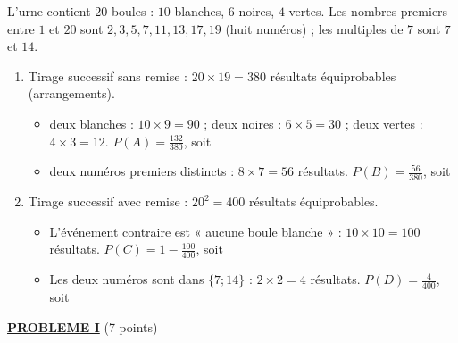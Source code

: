 \begin{description}
\begin{enumerate}
	\end{enumerate}
	\item[II. ]
	L'urne contient $20$ boules : $10$ blanches, $6$ noires, $4$ vertes.
	Les nombres premiers entre $1$ et $20$ sont $2, 3, 5, 7, 11, 13, 17, 19$ (huit numéros) ;
	les multiples de $7$ sont $7$ et $14$.
	\begin{enumerate}
		\item Tirage successif sans remise : $20 \times 19 = 380$ résultats équiprobables (arrangements).
		\begin{itemize}
			\item {}
				deux blanches : $10 \times 9 = 90$ ; deux noires : $6 \times 5 = 30$ ; deux vertes : $4 \times 3 = 12$.
				$P(A) = \frac{132}{380}$, soit \par\noindent{}
			\item {}
				deux numéros premiers distincts : $8 \times 7 = 56$ résultats.
				$P(B) = \frac{56}{380}$, soit \par\noindent{}
		\end{itemize}
		\item Tirage successif avec remise : $20^2 = 400$ résultats équiprobables.
		\begin{itemize}
			\item {}
				L'événement contraire est « aucune boule blanche » : $10 \times 10 = 100$ résultats.
				$P(C) = 1 - \frac{100}{400}$, soit \par\noindent{}
			\item {}
				Les deux numéros sont dans $\{7 ; 14\}$ : $2 \times 2 = 4$ résultats.
				$P(D) = \frac{4}{400}$, soit \par\noindent{}
		\end{itemize}
	\end{enumerate}
\end{description}
\noindent \underline{\textsc{\textbf{PROBLEME I}}} (7 points)
